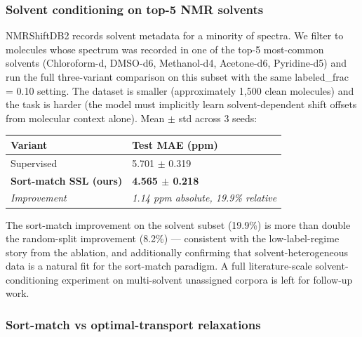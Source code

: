 \documentclass[
]{article}
\newcounter{none} %
\begin{document}
\subsubsection{Solvent conditioning on top-5 NMR
solvents}\label{solvent-conditioning-on-top-5-nmr-solvents}

NMRShiftDB2 records solvent metadata for a minority of spectra. We
filter to molecules whose spectrum was recorded in one of the top-5
most-common solvents (Chloroform-d, DMSO-d6, Methanol-d4, Acetone-d6,
Pyridine-d5) and run the full three-variant comparison on this subset
with the same labeled\_frac = 0.10 setting. The dataset is smaller
(approximately 1,500 clean molecules) and the task is harder (the model
must implicitly learn solvent-dependent shift offsets from molecular
context alone). Mean \(\pm\) std across 3 seeds:

{\def\LTcaptype{none} %
\begin{longtable}[]{@{}ll@{}}
\toprule\noalign{}
Variant & Test MAE (ppm) \\
\midrule\noalign{}
\endhead
\bottomrule\noalign{}
\endlastfoot
Supervised & 5.701 \(\pm\) 0.319 \\
\textbf{Sort-match SSL (ours)} & \textbf{4.565 \(\pm\) 0.218} \\
\emph{Improvement} & \emph{1.14 ppm absolute, 19.9\% relative} \\
\end{longtable}
}

The sort-match improvement on the solvent subset (19.9\%) is more than
double the random-split improvement (8.2\%) --- consistent with the
low-label-regime story from the ablation, and additionally confirming
that solvent-heterogeneous data is a natural fit for the sort-match
paradigm. A full literature-scale solvent-conditioning experiment on
multi-solvent unassigned corpora is left for follow-up work.

\subsubsection{Sort-match vs optimal-transport
relaxations}\label{sort-match-vs-optimal-transport-relaxations}
\end{document}
